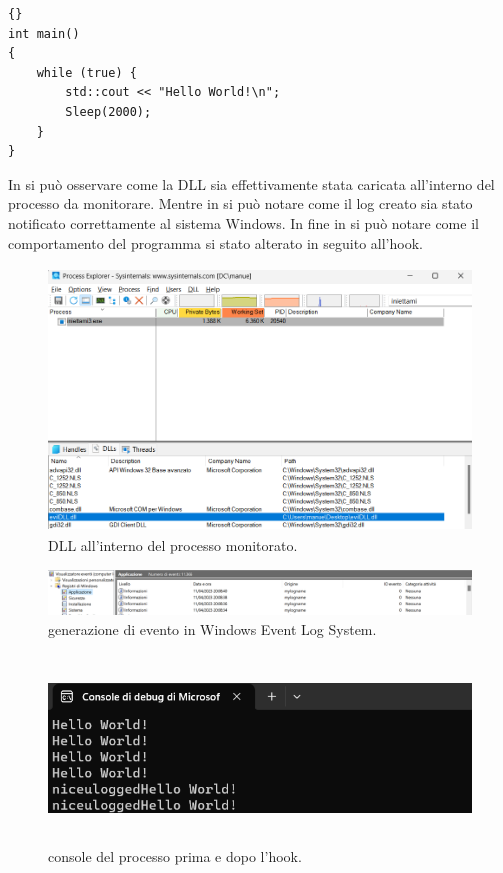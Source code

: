 \begin{lstlisting}[float=hbt,caption={semplice programma console su cui eseguire il test (iniettami3.exe).},captionpos=b,frame=single,basicstyle=\tiny]{}
int main()
{
    while (true) {
        std::cout << "Hello World!\n";
        Sleep(2000);
    }
}
\end{lstlisting}

In  si può osservare come la DLL sia effettivamente stata caricata all'interno del processo da monitorare.
Mentre in   si può notare come il log creato sia stato notificato correttamente al sistema Windows.
In fine in  si può notare come il comportamento del programma si stato alterato in seguito all'hook.

\begin{figure}[hbtp]
    \centering
    \includegraphics[width=\textwidth,height=7cm]{res/fig/hook-dll.png}
    \caption{DLL all'interno del processo monitorato.}
    \label{fig:hook1}
\end{figure}

\begin{figure}[hbtp]
    \centering
    \includegraphics[width=\textwidth]{res/fig/hook-evento.png}
    \caption{generazione di evento in Windows Event Log System.}
    \label{fig:hook2}
\end{figure}
\begin{figure}[hbtp]
    \centering
    \includegraphics[width=\textwidth,height=5cm]{res/fig/hook-console.png}
    \caption{console del processo prima e dopo l'hook.}
    \label{fig:hook3}
\end{figure}